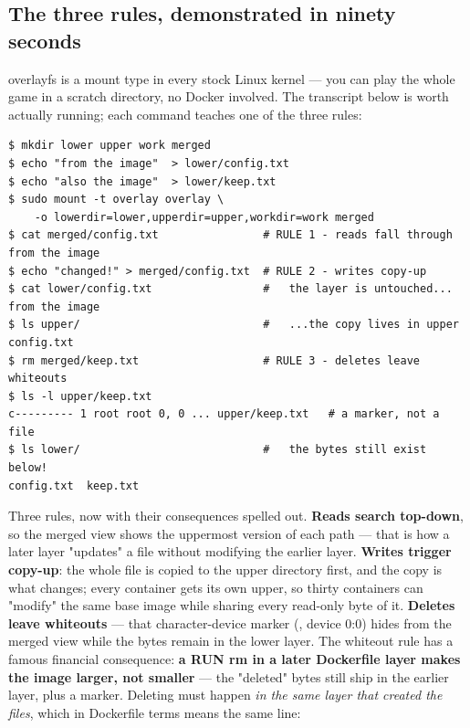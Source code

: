 \subsection*{The three rules, demonstrated in ninety seconds}

overlayfs is a mount type in every stock Linux kernel — you can play the whole game in a scratch directory, no Docker involved. The transcript below is worth actually running; each command teaches one of the three rules:

\begin{terminalbox}
\begin{Verbatim}[breaklines=true,breakanywhere=true,fontsize=\small,formatcom=\color{tbbtermfg},codes=\tbbcodeactive]
$ mkdir lower upper work merged
$ echo "from the image"  > lower/config.txt
$ echo "also the image"  > lower/keep.txt
$ sudo mount -t overlay overlay \
    -o lowerdir=lower,upperdir=upper,workdir=work merged
$ cat merged/config.txt                # RULE 1 - reads fall through
from the image
$ echo "changed!" > merged/config.txt  # RULE 2 - writes copy-up
$ cat lower/config.txt                 #   the layer is untouched...
from the image
$ ls upper/                            #   ...the copy lives in upper
config.txt
$ rm merged/keep.txt                   # RULE 3 - deletes leave whiteouts
$ ls -l upper/keep.txt
c--------- 1 root root 0, 0 ... upper/keep.txt   # a marker, not a file
$ ls lower/                            #   the bytes still exist below!
config.txt  keep.txt
\end{Verbatim}
\end{terminalbox}

Three rules, now with their consequences spelled out. \textbf{Reads search top-down}, so the merged view shows the uppermost version of each path — that is how a later layer "updates" a file without modifying the earlier layer. \textbf{Writes trigger copy-up}: the whole file is copied to the upper directory first, and the copy is what changes; every container gets its own upper, so thirty containers can "modify" the same base image while sharing every read-only byte of it. \textbf{Deletes leave whiteouts} — that character-device marker (, device 0:0) hides  from the merged view while the bytes remain in the lower layer. The whiteout rule has a famous financial consequence: \textbf{a RUN rm in a later Dockerfile layer makes the image larger, not smaller} — the "deleted" bytes still ship in the earlier layer, plus a marker. Deleting must happen \textit{in the same layer that created the files}, which in Dockerfile terms means the same  line:

